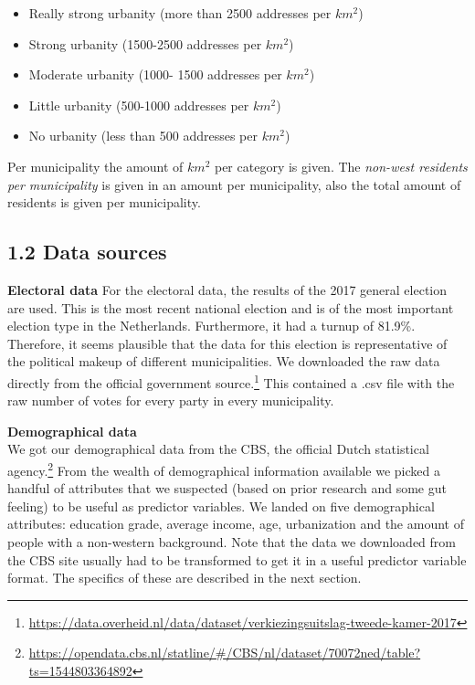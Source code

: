 \documentclass[11pt,]{article}
\let\rmarkdownfootnote\footnote%
\def\footnote{\protect\rmarkdownfootnote}
\begin{document}
\begin{itemize}
\item Really strong urbanity (more than 2500 addresses per $km^2$) 
\item Strong urbanity (1500-2500 addresses per $km^2$) 
\item Moderate urbanity (1000- 1500 addresses per $km^2$) 
\item Little urbanity (500-1000 addresses per $km^2$)  
\item No urbanity (less than 500 addresses per $km^2$)
\end{itemize}

Per municipality the amount of \(km^2\) per category is given. The
\emph{non-west residents per municipality} is given in an amount per
municipality, also the total amount of residents is given per
municipality.

\subsection{1.2 Data sources}\label{data-sources}

\textbf{Electoral data} For the electoral data, the results of the 2017
general election are used. This is the most recent national election and
is of the most important election type in the Netherlands. Furthermore,
it had a turnup of 81.9\%. Therefore, it seems plausible that the data
for this election is representative of the political makeup of different
municipalities. We downloaded the raw data directly from the official
government source.\footnote{\url{https://data.overheid.nl/data/dataset/verkiezingsuitslag-tweede-kamer-2017}}
This contained a .csv file with the raw number of votes for every party
in every municipality.

\textbf{Demographical data}\\
We got our demographical data from the CBS, the official Dutch
statistical agency.\footnote{\url{https://opendata.cbs.nl/statline/\#/CBS/nl/dataset/70072ned/table?ts=1544803364892}}
From the wealth of demographical information available we picked a
handful of attributes that we suspected (based on prior research and
some gut feeling) to be useful as predictor variables. We landed on five
demographical attributes: education grade, average income, age,
urbanization and the amount of people with a non-western background.
Note that the data we downloaded from the CBS site usually had to be
transformed to get it in a useful predictor variable format. The
specifics of these are described in the next section.
\end{document}
